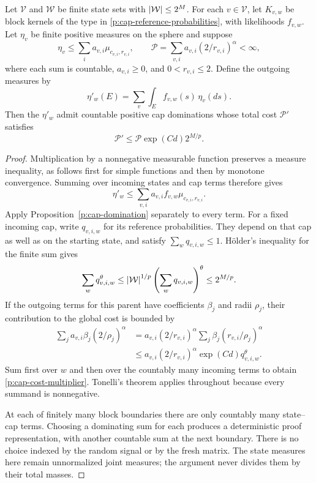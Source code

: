\begin{lemma}\label{p:cap-forward-step}
Let $\mathcal V$ and $\mathcal W$ be finite state sets with
$\left\lvert \mathcal W\right\rvert\le2^M$.  For each $v\in\mathcal V$, let
$K_{v,w}$ be block kernels of the type in
\eqref{p:cap-reference-probabilities}, with likelihoods $f_{v,w}$.
Let $\eta_v$ be finite positive measures on the sphere and suppose
\[
 \eta_v\le\sum_i a_{v,i}\mu_{c_{v,i},r_{v,i}},\qquad
 \mathcal P=\sum_{v,i}a_{v,i}(2/r_{v,i})^\alpha<\infty,
\]
where each sum is countable, $a_{v,i}\ge0$, and $0<r_{v,i}\le2$.
Define the outgoing measures by
\[
 \eta'_w(E)=\sum_v\int_E f_{v,w}(s)\,\eta_v(ds).
\]
Then the $\eta'_w$ admit countable positive cap dominations whose total
cost $\mathcal P'$ satisfies
\begin{equation}\label{p:cap-cost-multiplier}
 \mathcal P'\le\mathcal P\exp(Cd)2^{M/p}.
\end{equation}
\end{lemma}

\begin{proof}
Multiplication by a nonnegative measurable function preserves a measure
inequality, as follows first for simple functions and then by monotone
convergence.  Summing over incoming states and cap terms therefore gives
\[
 \eta'_w\le\sum_{v,i}a_{v,i}f_{v,w}\mu_{c_{v,i},r_{v,i}}.
\]
Apply Proposition~\ref{p:cap-domination} separately to every term.
For a fixed incoming cap, write $q_{v,i,w}$ for its reference
probabilities.  They depend on that cap as well as on the starting state,
and satisfy $\sum_wq_{v,i,w}\le1$.  H\"older's inequality for the finite
sum gives
\[
 \sum_wq_{v,i,w}^{\theta}
 \le\left\lvert \mathcal W\right\rvert^{1/p}\left(\sum_wq_{v,i,w}\right)^\theta
 \le2^{M/p}.
\]
If the outgoing terms for this parent have coefficients $\beta_j$ and radii
$\rho_j$, their contribution to the global cost is bounded by
\begin{align*}
 \sum_j a_{v,i}\beta_j(2/\rho_j)^\alpha
 &=a_{v,i}(2/r_{v,i})^\alpha
       \sum_j \beta_j(r_{v,i}/\rho_j)^\alpha\\
 &\le a_{v,i}(2/r_{v,i})^\alpha\exp(Cd)q_{v,i,w}^\theta.
\end{align*}
Sum first over $w$ and then over the countably many incoming terms to
obtain \eqref{p:cap-cost-multiplier}.  Tonelli's theorem applies
throughout because every summand is nonnegative.

At each of finitely many block boundaries there are only countably many
state--cap terms.  Choosing a dominating sum for each produces a
deterministic proof representation, with another countable sum at the
next boundary.  There is no choice indexed by the random signal or by
the fresh matrix.  The state measures here remain unnormalized joint
measures; the argument never divides them by their total masses.
\end{proof}

